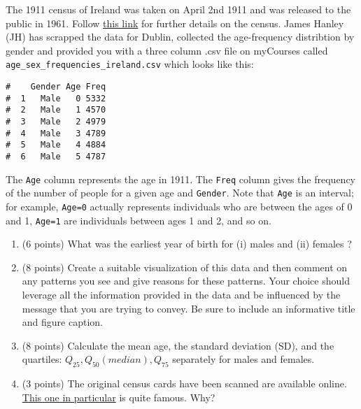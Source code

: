 \documentclass[letterpaper,12pt,twoside,]{pinp}
\providecommand{\tightlist}{%
  \setlength{\itemsep}{0pt}\setlength{\parskip}{0pt}}
\begin{document}
The 1911 census of Ireland was taken on April 2nd 1911 and was released
to the public in 1961. Follow
\href{http://www.census.nationalarchives.ie/help/about19011911census.html}{this
link} for further details on the census. James Hanley (JH) has scrapped
the data for Dublin, collected the age-frequency distribtion by gender
and provided you with a three column .csv file on myCourses called
\texttt{age\_sex\_frequencies\_ireland.csv} which looks like this:

\begin{Shaded}
\begin{Highlighting}[]
\StringTok{ }\NormalTok{(}\NormalTok{)}
\end{Highlighting}
\end{Shaded}

\begin{Shaded}
\begin{Highlighting}[]
\end{Highlighting}
\end{Shaded}

\begin{ShadedResult}
\begin{verbatim}
#    Gender Age Freq
#  1   Male   0 5332
#  2   Male   1 4570
#  3   Male   2 4979
#  4   Male   3 4789
#  5   Male   4 4884
#  6   Male   5 4787
\end{verbatim}
\end{ShadedResult}

The \texttt{Age} column represents the age in 1911. The \texttt{Freq}
column gives the frequency of the number of people for a given age and
\texttt{Gender}. Note that \texttt{Age} is an interval; for example,
\texttt{Age=0} actually represents individuals who are between the ages
of 0 and 1, \texttt{Age=1} are individuals between ages 1 and 2, and so
on.

\begin{enumerate}
\def\labelenumi{\alph{enumi})}
\tightlist
\item
  (6 points) What was the earliest year of birth for (i) males and (ii)
  females ?
\item
  (8 points) Create a suitable visualization of this data and then
  comment on any patterns you see and give reasons for these patterns.
  Your choice should leverage all the information provided in the data
  and be influenced by the message that you are trying to convey. Be
  sure to include an informative title and figure caption.
\item
  (8 points) Calculate the mean age, the standard deviation (SD), and
  the quartiles: \(Q_{25}, Q_{50} (median), Q_{75}\) separately for
  males and females.
\item
  (3 points) The original census cards have been scanned are available
  online.
  \href{http://www.census.nationalarchives.ie/reels/nai000230598/}{This
  one in particular} is quite famous. Why?
\end{enumerate}
\end{document}
